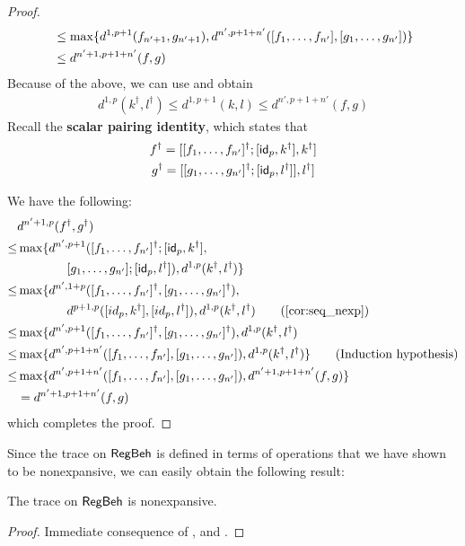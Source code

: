 \begin{proof}
\begin{align*}
	&\leq \max \{d^{1,p + 1}(f_{n' + 1},g_{n' + 1}), d^{n', p + 1 + n'}([ f_1, \dots, f_{n'}], [ g_1, \dots, g_{n'}] ) \} \\
	&\leq d^{n' + 1, p + 1 + n'}(f,g)
	\end{align*}
	Because of the above, we can use  and obtain
	\begin{align*}
		d^{1,p}(k^\dagger, l^\dagger) \leq 	d^{1,p + 1}(k,l) \leq d^{n', p + 1 + n'}(f,g)
	\end{align*}
	Recall the \textbf{scalar pairing identity}, which states that
	\begin{gather*}
	f^\dagger = [[ f_1, \dots, f_{n'}]^\dagger ; [ \mathsf{id}_p ,k^\dagger] , k^\dagger] \\
	g^\dagger = [[ g_1, \dots, g_{n'}]^\dagger ; [ \mathsf{id}_p, l^\dagger ]  ], l^\dagger]
	\end{gather*}
	
	We have the following:
	\begin{align*}
		&d^{n' + 1, p}(f^\dagger, g^\dagger)\\
		\leq & \max \{d^{n', p + 1}(\lc f_1, \dots, f_{n'}\rc^\dagger; \lc \id_p,k^\dagger\rc,\\&\qquad\qquad  \lc g_1, \dots, g_{n'}\rc; \lc \id_p , l^\dagger\rc), d^{1,p}(k^\dagger, l^\dagger)\}\\
		\leq & \max \{d^{n', 1 + p}(\lc f_1, \dots, f_{n'}\rc^\dagger, \lc g_1, \dots, g_{n'}\rc^\dagger),\\&\qquad\qquad  d^{p + 1, p}(\lc id_p , k^\dagger\rc, \lc id_p ,l^\dagger\rc),  d^{1,p}(k^\dagger, l^\dagger) \tag{\Cref{cor:seq_nexp}}\\
		\leq & \max \{d^{n', p + 1}(\lc f_1, \dots, f_{n'}\rc^\dagger, \lc g_1, \dots, g_{n'}\rc^\dagger), d^{1,p}(k^\dagger, l^\dagger)\\
		\leq & \max \{d^{n', p + 1 + n'}(\lc f_1, \dots, f_{n'}\rc, \lc g_1, \dots, g_{n'}\rc ), d^{1,p}(k^\dagger, l^\dagger)\} \tag{Induction hypothesis}\\
		\leq & \max \{d^{n', p + 1 + n'}(\lc f_1, \dots, f_{n'}\rc, \lc g_1, \dots, g_{n'}\rc ),  d^{n' + 1, p + 1 + n'}(f,g)\} \\
		&=  d^{n' + 1, p + 1 + n'}(f,g)
	\end{align*}
	which completes the proof.
\end{proof}
Since the trace on $\mathsf{RegBeh}$ is defined in terms of operations that we have shown to be nonexpansive, we can easily obtain the following result:
\begin{corollary}\label{cor:trace_nonexpansive}
	The trace on $\mathsf{RegBeh}$ is nonexpansive.
\end{corollary}
\begin{proof}
	Immediate consequence of ,  and .
\end{proof}
